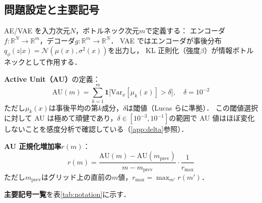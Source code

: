 \documentclass[11pt,a4paper]{jsarticle}
\newcommand{\R}{\mathbb{R}}
\begin{document}
\subsection{問題設定と主要記号}\label{sec:framework_setup}

AE/VAE を入力次元$N$，ボトルネック次元$m$で定義する：
エンコーダ$f: \R^N \to \R^m$，デコーダ$g: \R^m \to \R^N$．
VAE ではエンコーダが事後分布$q_\phi(z|x) = \mathcal{N}(\mu(x), \sigma^2(x))$を出力し，
KL 正則化（強度$\beta$）が情報ボトルネックとして作用する．

\textbf{Active Unit（AU）}の定義：
\begin{equation}
  \mathrm{AU}(m) = \sum_{k=1}^{m} \mathbf{1}\bigl[\mathrm{Var}_x[\mu_k(x)] > \delta\bigr],
  \quad \delta = 10^{-2}
  \label{eq:au_def}
\end{equation}
ただし$\mu_k(x)$は事後平均の第$k$成分，$\delta$は閾値（Lucas ら\cite{lucas2019elbo}に準拠）．
この閾値選択に対して AU は極めて頑健であり，$\delta \in [10^{-3}, 10^{-1}]$の範囲で AU 値はほぼ変化しないことを感度分析で確認している（\ref{app:delta}参照）．

\textbf{AU 正規化増加率}$r(m)$：
\begin{equation}
  r(m) = \frac{\mathrm{AU}(m) - \mathrm{AU}(m_{\mathrm{prev}})}{m - m_{\mathrm{prev}}} \cdot \frac{1}{r_{\max}}
  \label{eq:au_rate}
\end{equation}
ただし$m_{\mathrm{prev}}$はグリッド上の直前の$m$値，$r_{\max} = \max_{m'} r(m')$．

\textbf{主要記号一覧}を表\ref{tab:notation}に示す．
\end{document}
